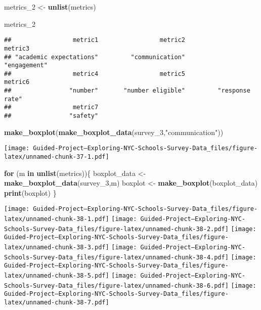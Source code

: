 \documentclass[]{article}
\newenvironment{Shaded}{\begin{snugshade}}{\end{snugshade}}
\newcommand{\ControlFlowTok}[1]{\textcolor[rgb]{0.13,0.29,0.53}{\textbf{#1}}}
\newcommand{\DecValTok}[1]{\textcolor[rgb]{0.00,0.00,0.81}{#1}}
\newcommand{\KeywordTok}[1]{\textcolor[rgb]{0.13,0.29,0.53}{\textbf{#1}}}
\newcommand{\NormalTok}[1]{#1}
\newcommand{\StringTok}[1]{\textcolor[rgb]{0.31,0.60,0.02}{#1}}
\begin{document}
\begin{Shaded}
\begin{Highlighting}[]
\NormalTok{metrics_}\DecValTok{2}\NormalTok{ <-}\StringTok{ }\KeywordTok{unlist}\NormalTok{(metrics)}

\NormalTok{metrics_}\DecValTok{2}
\end{Highlighting}
\end{Shaded}

\begin{verbatim}
##                 metric1                 metric2                 metric3 
## "academic expectations"         "communication"            "engagement" 
##                 metric4                 metric5                 metric6 
##                "number"       "number eligible"         "response rate" 
##                 metric7 
##                "safety"
\end{verbatim}

\begin{Shaded}
\begin{Highlighting}[]
\KeywordTok{make_boxplot}\NormalTok{(}\KeywordTok{make_boxplot_data}\NormalTok{(survey_}\DecValTok{3}\NormalTok{,}\StringTok{"communication"}\NormalTok{))}
\end{Highlighting}
\end{Shaded}

\texttt{[image: Guided-Project--Exploring-NYC-Schools-Survey-Data\_files/figure-latex/unnamed-chunk-37-1.pdf]}

\begin{Shaded}
\begin{Highlighting}[]
\ControlFlowTok{for}\NormalTok{ (m }\ControlFlowTok{in} \KeywordTok{unlist}\NormalTok{(metrics))\{}
\NormalTok{  boxplot_data <-}\StringTok{ }\KeywordTok{make_boxplot_data}\NormalTok{(survey_}\DecValTok{3}\NormalTok{,m)}
\NormalTok{  boxplot <-}\StringTok{ }\KeywordTok{make_boxplot}\NormalTok{(boxplot_data)}
  \KeywordTok{print}\NormalTok{(boxplot)}
\NormalTok{\}}
\end{Highlighting}
\end{Shaded}

\texttt{[image: Guided-Project--Exploring-NYC-Schools-Survey-Data\_files/figure-latex/unnamed-chunk-38-1.pdf]}
\texttt{[image: Guided-Project--Exploring-NYC-Schools-Survey-Data\_files/figure-latex/unnamed-chunk-38-2.pdf]}
\texttt{[image: Guided-Project--Exploring-NYC-Schools-Survey-Data\_files/figure-latex/unnamed-chunk-38-3.pdf]}
\texttt{[image: Guided-Project--Exploring-NYC-Schools-Survey-Data\_files/figure-latex/unnamed-chunk-38-4.pdf]}
\texttt{[image: Guided-Project--Exploring-NYC-Schools-Survey-Data\_files/figure-latex/unnamed-chunk-38-5.pdf]}
\texttt{[image: Guided-Project--Exploring-NYC-Schools-Survey-Data\_files/figure-latex/unnamed-chunk-38-6.pdf]}
\texttt{[image: Guided-Project--Exploring-NYC-Schools-Survey-Data\_files/figure-latex/unnamed-chunk-38-7.pdf]}
\end{document}
